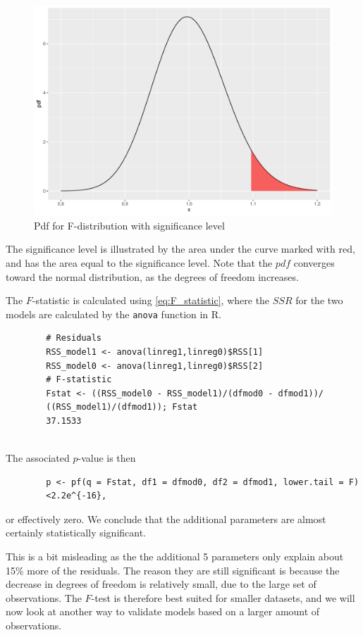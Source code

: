     \begin{figure}[H]
        \centering
      \includegraphics[width = 0.5 \textwidth]{figures/Fdistsign.pdf}
      \caption{Pdf for F-distribution with significance level}
      \label{fig:my_label}
    \end{figure}
    
    The significance level is illustrated by the area under the curve marked with red, and has the area equal to the significance level. Note that the $pdf$ converges toward the normal distribution, as the degrees of freedom increases.
    
    The $F$-statistic is calculated using \eqref{eq:F_statistic}, where the $SSR$ for the two models are calculated by the \texttt{anova} function in R. 
    \begin{lstlisting}
        # Residuals
        RSS_model1 <- anova(linreg1,linreg0)$RSS[1]
        RSS_model0 <- anova(linreg1,linreg0)$RSS[2]
        # F-statistic
        Fstat <- ((RSS_model0 - RSS_model1)/(dfmod0 - dfmod1))/
        ((RSS_model1)/(dfmod1)); Fstat
        37.1533
        
    \end{lstlisting}
    
    The associated $p$-value is then
    
    \begin{lstlisting}
        p <- pf(q = Fstat, df1 = dfmod0, df2 = dfmod1, lower.tail = F)
        <2.2e^{-16},
    \end{lstlisting}
    
    or effectively zero. We conclude that the additional parameters are almost certainly statistically significant.
    
    This is a bit misleading as the the additional 5 parameters only explain about 15\% more of the residuals. 
    The reason they are still significant is because the decrease in degrees of freedom is relatively small, due to the large set of observations.
    The $F$-test is therefore best suited for smaller datasets, and we will now look at another way to validate models based on a larger amount of observations. 

